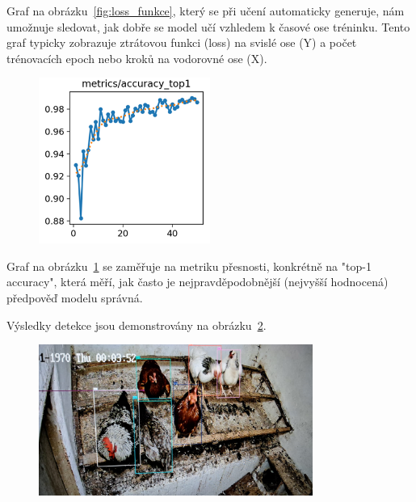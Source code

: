 Graf na obrázku~\ref{fig:loss_funkce}, který se při učení automaticky generuje, nám umožnuje sledovat, jak dobře se model učí vzhledem k časové ose tréninku.
Tento graf typicky zobrazuje ztrátovou funkci (loss) na svislé ose (Y) a počet trénovacích epoch nebo kroků na vodorovné ose (X).

\begin{figure}[htbp]
    \centering
    \includegraphics[width=0.5\textwidth]{img/top1_accuracy}
    \label{fig:top1_accuracy}
\end{figure}

Graf na obrázku~\ref{fig:top1_accuracy} se zaměřuje na metriku přesnosti, konkrétně na
"top-1 accuracy", která měří, jak často je nejpravděpodobnější (nejvyšší hodnocená) předpověď modelu správná.

Výsledky detekce jsou demonstrovány na obrázku~\ref{fig:detekce_slepic}.

\begin{figure}[htbp]
    \centering
    \includegraphics[width=0.8\textwidth]{img/detekce_slepic}
    \label{fig:detekce_slepic}
\end{figure}
